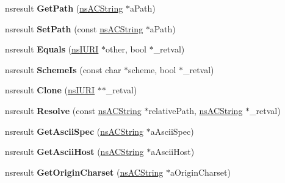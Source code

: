 \begin{DoxyCompactItemize}
\mbox{\label{interfacens_i_u_r_i_a82f888b332cb845d86640ca42336b7fb}} 
nsresult {\bfseries Get\+Path} (\hyperlink{structns_c_string_container}{ns\+A\+C\+String} $\ast$a\+Path)
\item 
\mbox{\label{interfacens_i_u_r_i_ab0c3ad7ee49000cd82c349c7bfdf94f3}} 
nsresult {\bfseries Set\+Path} (const \hyperlink{structns_c_string_container}{ns\+A\+C\+String} $\ast$a\+Path)
\item 
\mbox{\label{interfacens_i_u_r_i_a95c5fb5c37ea1843fb43edb7f3af4cac}} 
nsresult {\bfseries Equals} (\hyperlink{interfacens_i_u_r_i}{ns\+I\+U\+RI} $\ast$other, bool $\ast$\+\_\+retval)
\item 
\mbox{\label{interfacens_i_u_r_i_a06a6671958c32d46fb48f75f7321f93c}} 
nsresult {\bfseries Scheme\+Is} (const char $\ast$scheme, bool $\ast$\+\_\+retval)
\item 
\mbox{\label{interfacens_i_u_r_i_a9bd2fa81b899aef76186dfb2f825ae69}} 
nsresult {\bfseries Clone} (\hyperlink{interfacens_i_u_r_i}{ns\+I\+U\+RI} $\ast$$\ast$\+\_\+retval)
\item 
\mbox{\label{interfacens_i_u_r_i_abf6d8228a2711bfe5e47577897661ca4}} 
nsresult {\bfseries Resolve} (const \hyperlink{structns_c_string_container}{ns\+A\+C\+String} $\ast$relative\+Path, \hyperlink{structns_c_string_container}{ns\+A\+C\+String} $\ast$\+\_\+retval)
\item 
\mbox{\label{interfacens_i_u_r_i_a17aaa7b739c121caa129d40935856006}} 
nsresult {\bfseries Get\+Ascii\+Spec} (\hyperlink{structns_c_string_container}{ns\+A\+C\+String} $\ast$a\+Ascii\+Spec)
\item 
\mbox{\label{interfacens_i_u_r_i_ac57421e01dab18cb1e44dc85580167b6}} 
nsresult {\bfseries Get\+Ascii\+Host} (\hyperlink{structns_c_string_container}{ns\+A\+C\+String} $\ast$a\+Ascii\+Host)
\item 
\mbox{\label{interfacens_i_u_r_i_a2fadf7280025931aafc231a9429d9486}} 
nsresult {\bfseries Get\+Origin\+Charset} (\hyperlink{structns_c_string_container}{ns\+A\+C\+String} $\ast$a\+Origin\+Charset)
$$
\end{DoxyCompactItemize}
